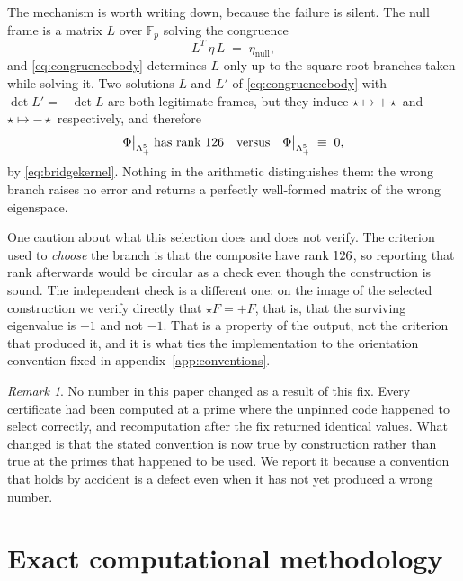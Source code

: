 \documentclass[11pt,a4paper]{article}
\theoremstyle{definition}
\theoremstyle{remark}
\newtheorem{remark}[theorem]{Remark}
\newcommand{\Fp}{\mathbb{F}_p}
\begin{document}
The mechanism is worth writing down, because the failure is silent. The null
frame is a matrix $L$ over $\Fp$ solving the congruence
\begin{equation}
L^{T}\,\eta\,L \;=\; \eta_{\mathrm{null}},
\label{eq:congruencebody}
\end{equation}
and \eqref{eq:congruencebody} determines $L$ only up to the square-root branches
taken while solving it. Two solutions $L$ and $L'$ of \eqref{eq:congruencebody}
with $\det L' = -\det L$ are both legitimate frames, but they induce
$\star \mapsto +\star$ and $\star \mapsto -\star$ respectively, and therefore
\begin{equation}
\Phi\big|_{\Lambda^5_+} \;\text{has rank } 126
\quad\text{versus}\quad
\Phi\big|_{\Lambda^5_+} \;\equiv\; 0,
\label{eq:branchconsequence}
\end{equation}
by \eqref{eq:bridgekernel}. Nothing in the arithmetic distinguishes them: the
wrong branch raises no error and returns a perfectly well-formed matrix of the
wrong eigenspace.

One caution about what this selection does and does not verify. The criterion
used to \emph{choose} the branch is that the composite have rank
$126$, so reporting that rank afterwards would be circular as a
check even though the construction is sound. The independent check is a different
one: on the image of the selected construction we verify directly that
$\star F = +F$, that is, that the surviving eigenvalue is $+1$ and not $-1$. That
is a property of the output, not the criterion that produced it, and it is what
ties the implementation to the orientation convention fixed in
appendix~\ref{app:conventions}.

\begin{remark}
No number in this paper changed as a result of this fix. Every certificate had
been computed at a prime where the unpinned code happened to select correctly,
and recomputation after the fix returned identical values. What changed is that
the stated convention is now true by construction rather than true at the primes
that happened to be used. We report it because a convention that holds by
accident is a defect even when it has not yet produced a wrong number.
\end{remark}

\section{Exact computational methodology}
\label{sec:method}
\end{document}
